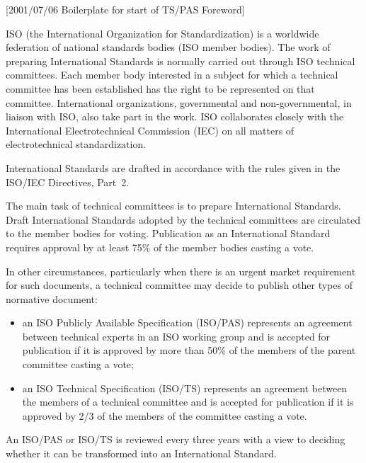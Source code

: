 [2001/07/06 Boilerplate for start of TS/PAS Foreword]

ISO (the International Organization for Standardization) is a worldwide
federation of national standards bodies (ISO member bodies). The work
of preparing International Standards is normally carried out through
ISO technical committees. Each member body interested in a subject for
which a technical committee has been established has the right to be
represented on that committee. International organizations,
governmental and non-governmental, in liaison with ISO, also take part
in the work. ISO collaborates closely with the International
Electrotechnical Commission (IEC) on all matters of electrotechnical
standardization.

International Standards are drafted in accordance with the rules given
in the ISO/IEC Directives, Part~2.

    The main task of technical committees is to prepare International
Standards.
Draft International Standards adopted by the technical committees are
circulated to the member bodies for voting. Publication as an
International Standard requires approval by at least 75\% of the member
bodies casting a vote.

    In other circumstances, particularly when there is an urgent market
requirement for such documents, a technical committee may decide to
publish other types of normative document:
\begin{itemize}
\item an ISO Publicly Available Specification (ISO/PAS) represents an
agreement between technical experts in an ISO working group and is
accepted for publication if it is approved by more than 50\% of the
members of the parent committee casting a vote;

\item an ISO Technical Specification (ISO/TS) represents an agreement
between the members of a technical committee and is accepted for
publication if it is approved by 2/3 of the members of the committee
casting a vote.
\end{itemize}

    An ISO/PAS or ISO/TS is reviewed every three years with a view to
deciding whether it can be transformed into an International Standard.
\par

\endinput
